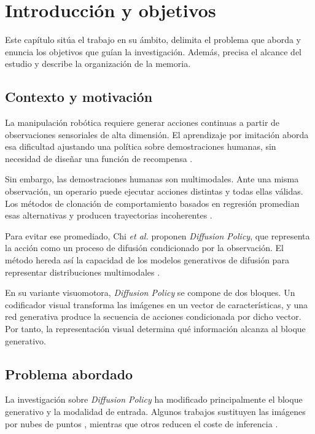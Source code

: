 \chapter{Introducci\'on y objetivos}
\label{cap:introduccion}

Este cap\'itulo sit\'ua el trabajo en su \'ambito, delimita el problema que aborda y
enuncia los objetivos que gu\'ian la investigaci\'on. Adem\'as, precisa el alcance del
estudio y describe la organizaci\'on de la memoria.

\section{Contexto y motivaci\'on}
\label{sec:contexto}

La manipulaci\'on rob\'otica requiere generar acciones continuas a partir de
observaciones sensoriales de alta dimensi\'on. El aprendizaje por imitaci\'on aborda esa
dificultad ajustando una pol\'itica sobre demostraciones humanas, sin necesidad de
dise\~nar una funci\'on de recompensa \cite{ross2011dagger}.

Sin embargo, las demostraciones humanas son multimodales. Ante una misma observaci\'on,
un operario puede ejecutar acciones distintas y todas ellas v\'alidas. Los m\'etodos de
clonaci\'on de comportamiento basados en regresi\'on promedian esas alternativas y
producen trayectorias incoherentes \cite{florence2021ibc}.

Para evitar ese promediado, Chi \textit{et al.} \cite{chi2025diffusion} proponen
\textit{Diffusion Policy}, que representa la acci\'on como un proceso de difusi\'on
condicionado por la observaci\'on. El m\'etodo hereda as\'i la capacidad de los modelos
generativos de difusi\'on para representar distribuciones multimodales
\cite{ho2020ddpm}.

En su variante visuomotora, \textit{Diffusion Policy} se compone de dos bloques. Un
codificador visual transforma las im\'agenes en un vector de caracter\'isticas, y una red
generativa produce la secuencia de acciones condicionada por dicho vector. Por tanto, la
representaci\'on visual determina qu\'e informaci\'on alcanza al bloque generativo.

\section{Problema abordado}
\label{sec:problema}

La investigaci\'on sobre \textit{Diffusion Policy} ha modificado principalmente el
bloque generativo y la modalidad de entrada. Algunos trabajos sustituyen las im\'agenes
por nubes de puntos \cite{ze2024dp3}, mientras que otros reducen el coste de inferencia
\cite{prasad2024consistency}.

